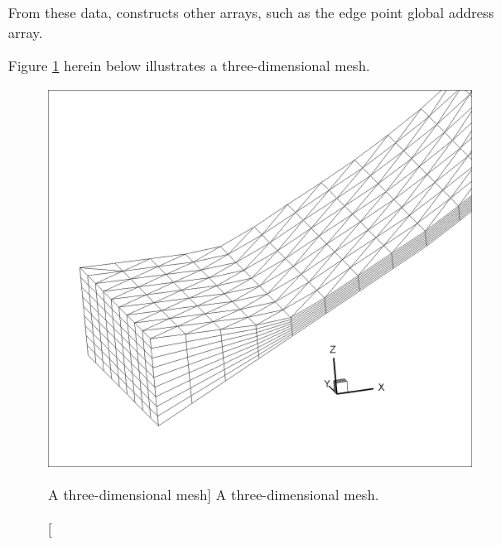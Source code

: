 From these data,  constructs other arrays, such as the edge point
global address array.

Figure \ref{fig:3dmesh} herein below illustrates a  three-dimensional mesh.

\begin{figure}[H]%
\begin{center}
%
  \includegraphics*[width=.7\textwidth]{./graphics/3dmesh}
%
\end{center}
\caption
[A three-dimensional mesh]
{A three-dimensional mesh.}
\label{fig:3dmesh}
\
\end{figure}

